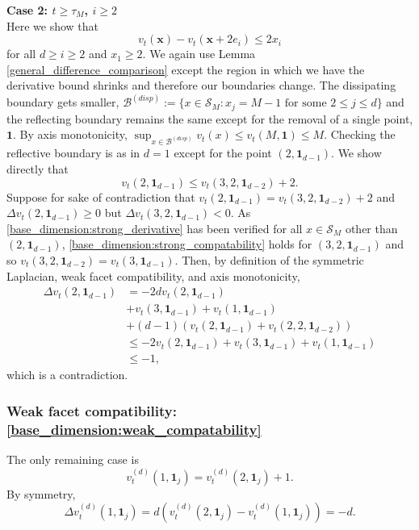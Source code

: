 \documentclass[12pt]{amsart}
\begin{document}
{\bf Case 2: $t \geq \tau_M$, $i \geq 2$} \\ 
Here we show that
\[
v_t(\mathbf{x}) - v_t(\mathbf{x} + 2 e_i) \leq 2 x_i
\]
for all $d \geq i \geq 2$ and $x_1 \geq 2$. We again use Lemma \ref{general_difference_comparison}
except the region in which we have the derivative bound shrinks and therefore our boundaries change. 
The dissipating boundary gets smaller,  $\mathcal{B}^{(disp)} := \{x \in \mathcal{S}_M : x_j = M-1 \mbox{ for some $2 \leq j \leq d$}\}$
and the reflecting boundary remains the same except for the removal of a single point, $\mathbf{1}$. 
By axis monotonicity, $\sup_{x \in \mathcal{B}^{(disp)}} v_t(x) \leq v_t(M, \mathbf{1}) \leq M$.
Checking the reflective boundary is as in $d=1$ except for the point $(2,\mathbf{1}_{d-1})$.
We show directly that 
\begin{equation} \label{eq:reflecting_point}
v_t(2,\mathbf{1}_{d-1}) \leq v_t(3,2,\mathbf{1}_{d-2}) + 2.
\end{equation}
Suppose for sake of contradiction that $v_t(2,\mathbf{1}_{d-1}) = v_t(3,2,\mathbf{1}_{d-2}) + 2$
and $\Delta v_t(2,\mathbf{1}_{d-1}) \geq 0$ but $\Delta v_t(3,2,\mathbf{1}_{d-1}) < 0$. 
As \eqref{base_dimension:strong_derivative} has been verified for all $x \in \mathcal{S}_M$ other than $(2, \mathbf{1}_{d-1})$, 
\eqref{base_dimension:strong_compatability} holds for $(3,2,\mathbf{1}_{d-1})$ and so %
$v_t(3,2,\mathbf{1}_{d-2}) = v_{t}(3,\mathbf{1}_{d-1})$. 
Then, by definition of the symmetric Laplacian, weak facet compatibility, and axis monotonicity, 
\begin{align*}
\Delta v_t(2,\mathbf{1}_{d-1}) &=  -2d v_t(2, \mathbf{1}_{d-1}) \\
&+ v_t(3, \mathbf{1}_{d-1}) + v_t(1, \mathbf{1}_{d-1}) \\
&+ (d-1) \left( v_t(2,\mathbf{1}_{d-1}) + v_t(2,2,\mathbf{1}_{d-2}) \right) \\
&\leq -2 v_t(2, \mathbf{1}_{d-1}) + v_t(3, \mathbf{1}_{d-1}) + v_t(1, \mathbf{1}_{d-1}) \\
&\leq -1,
\end{align*}
which is a contradiction. 





\subsubsection*{Weak facet compatibility: \eqref{base_dimension:weak_compatability}}
The only remaining case is 
\[
v_t^{(d)}(1, \mathbf{1}_j) = v_{t}^{(d)}(2,\mathbf{1}_j) + 1.
\]
By symmetry, 
\[
\Delta v_t^{(d)}(1, \mathbf{1}_j) = d (v_t^{(d)}(2, \mathbf{1}_j) - v_t^{(d)}(1, \mathbf{1}_j)) = -d.
\]
\end{document}
